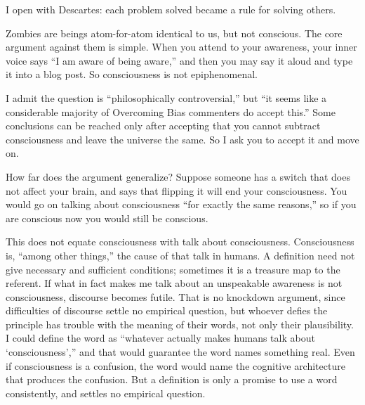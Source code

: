 
I open with Descartes: each problem solved became a rule for solving others. 

Zombies are beings atom-for-atom identical to us, but not conscious. The core argument against them is simple. When you attend to your awareness, your inner voice says ``I am aware of being aware,'' and then you may say it aloud and type it into a blog post. So consciousness is not epiphenomenal. 

I admit the question is ``philosophically controversial,'' but ``it seems like a considerable majority of Overcoming Bias commenters do accept this.'' Some conclusions can be reached only after accepting that you cannot subtract consciousness and leave the universe the same. So I ask you to accept it and move on.

How far does the argument generalize? Suppose someone has a switch that does not affect your brain, and says that flipping it will end your consciousness. You would go on talking about consciousness ``for exactly the same reasons,'' so if you are conscious now you would still be conscious.

This does not equate consciousness with talk about consciousness. Consciousness is, ``among other things,'' the cause of that talk in humans. A definition need not give necessary and sufficient conditions; sometimes it is a treasure map to the referent. If what in fact makes me talk about an unspeakable awareness is not consciousness, discourse becomes futile. That is no knockdown argument, since difficulties of discourse settle no empirical question, but whoever defies the principle has trouble with the meaning of their words, not only their plausibility. I could define the word as ``whatever actually makes humans talk about `consciousness','' and that would guarantee the word names something real. Even if consciousness is a confusion, the word would name the cognitive architecture that produces the confusion. But a definition is only a promise to use a word consistently, and settles no empirical question.


